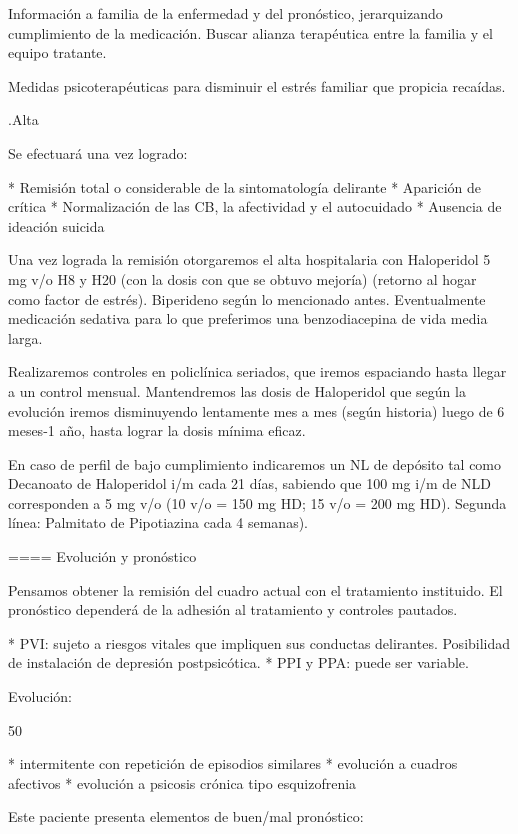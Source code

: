 Información a familia de la enfermedad y del pronóstico, jerarquizando cumplimiento de la medicación. Buscar alianza terapéutica entre la familia y el equipo tratante.

Medidas psicoterapéuticas para disminuir el estrés familiar que propicia recaídas.

.Alta

Se efectuará una vez logrado:

* Remisión total o considerable de la sintomatología delirante
* Aparición de crítica
* Normalización de las CB, la afectividad y el autocuidado
* Ausencia de ideación suicida


Una vez lograda la remisión otorgaremos el alta hospitalaria con Haloperidol 5 mg v/o H8 y H20 (con la dosis con que se obtuvo mejoría) (retorno al hogar como factor de estrés). Biperideno según lo mencionado antes. Eventualmente medicación sedativa para lo que preferimos una benzodiacepina de vida media larga.

Realizaremos controles en policlínica seriados, que iremos espaciando hasta llegar a un control mensual. Mantendremos las dosis de Haloperidol que según la evolución iremos disminuyendo lentamente mes a mes (según historia) luego de 6 meses-1 año, hasta lograr la dosis mínima eficaz.

En caso de perfil de bajo cumplimiento indicaremos un NL de depósito tal como Decanoato de Haloperidol i/m cada 21 días, sabiendo que 100 mg i/m de NLD corresponden a 5 mg v/o (10 v/o = 150 mg HD; 15 v/o = 200 mg HD). Segunda línea: Palmitato de Pipotiazina cada 4 semanas).

==== Evolución y pronóstico

Pensamos obtener la remisión del cuadro actual con el tratamiento instituido. El pronóstico dependerá de la adhesión al tratamiento y controles pautados.

* PVI: sujeto a riesgos vitales que impliquen sus conductas delirantes. Posibilidad de instalación de depresión postpsicótica.
* PPI y PPA: puede ser variable.

Evolución:

50%

* intermitente con repetición de episodios similares
* evolución a cuadros afectivos
* evolución a psicosis crónica tipo esquizofrenia

Este paciente presenta elementos de buen/mal pronóstico:


